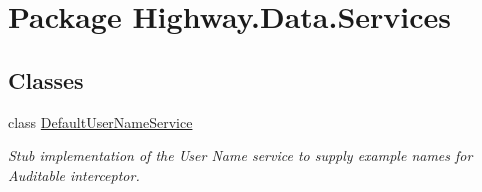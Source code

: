\hypertarget{namespace_highway_1_1_data_1_1_services}{\section{Package Highway.\-Data.\-Services}
\label{namespace_highway_1_1_data_1_1_services}
}
\subsection*{Classes}
\begin{DoxyCompactItemize}
\item 
class \hyperlink{class_highway_1_1_data_1_1_services_1_1_default_user_name_service}{Default\-User\-Name\-Service}
\begin{DoxyCompactList}\small\item\em Stub implementation of the User Name service to supply example names for Auditable interceptor. \end{DoxyCompactList}\end{DoxyCompactItemize}
